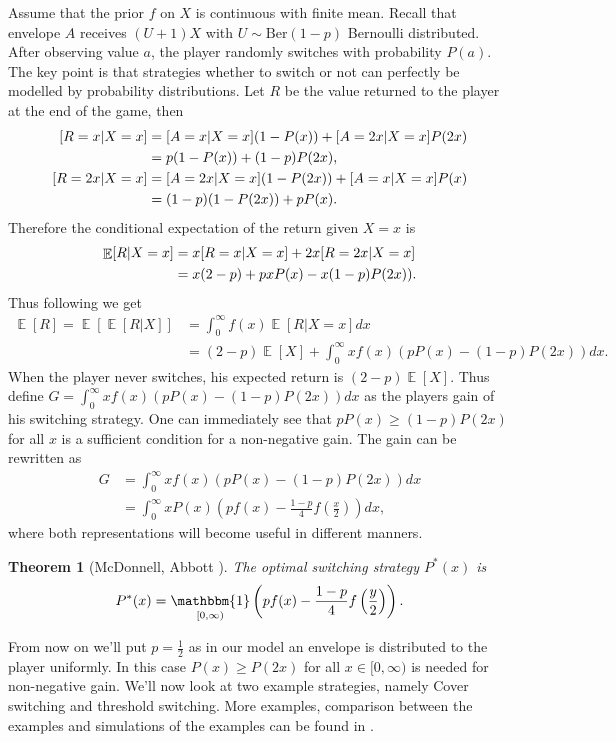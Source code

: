 \documentclass[twoside,a4paper]{article}
\theoremstyle{plain}
\newtheorem{theorem}{Theorem}[section]
\theoremstyle{definition}
\theoremstyle{remark}
\numberwithin{equation}{section}
\let\P\relax
\DeclareMathOperator{\P}{\mathbb{P}}
\DeclareMathOperator{\E}{\mathbb{E}}
\DeclareMathOperator{\1}{\mathbbm{1}}
\begin{document}
Assume that the prior $f$ on $X$ is continuous with finite mean. Recall that envelope $A$ receives $(U+1)X$ with $U\sim\mathrm{Ber}(1-p)$ Bernoulli distributed. After observing value $a$, the player randomly switches with probability $P(a)$. The key point is that strategies whether to switch or not can perfectly be modelled by probability distributions. Let $R$ be the value returned to the player at the end of the game, then
\begin{align*}
\P[R=x|X=x]&=\P[A=x|X=x](1-P(x))+\P[A=2x|X=x]P(2x)\\
&=p(1-P(x))+(1-p)P(2x),\\
\P[R=2x|X=x]&=\P[A=2x|X=x](1-P(2x))+\P[A=x|X=x]P(x)\\
&=(1-p)(1-P(2x))+pP(x).
\end{align*}
Therefore the conditional expectation of the return given $X=x$ is 
\begin{align*}
\E[R|X=x]&=x\P[R=x|X=x]+2x\P[R=2x|X=x]\\
&=x(2-p)+pxP(x)-x(1-p)P(2x)).
\end{align*}
Thus following \cite{McDonnell09} we get
\begin{align*}
\E[R]=\E[\E[R|X]]&=\int_0^\infty f(x)\E[R|X=x]dx\\
&=(2-p)\E[X]+\int_0^\infty xf(x)(pP(x)-(1-p)P(2x))dx.
\end{align*}
When the player never switches, his expected return is $(2-p)\E[X]$. Thus define $G=\int_0^\infty xf(x)(pP(x)-(1-p)P(2x))dx$ as the players gain of his switching strategy. One can immediately see that $pP(x)\geq(1-p)P(2x)$ for all $x$ is a sufficient condition for a non-negative gain. The gain can be rewritten as
\begin{align}
G&=\int_0^\infty xf(x)(pP(x)-(1-p)P(2x))dx\\
&=\int_0^\infty xP(x)\left(pf(x)-\frac{1-p}{4}f\left(\frac{x}{2}\right)\right)dx,\label{eq:gainprop}
\end{align}
where both representations will become useful in different manners.
\begin{theorem}[McDonnell, Abbott \cite{McDonnell09}]\label{thm:switchopt}
The optimal switching strategy $P^*(x)$ is 
\[P^*(x)=\1_{[0,\infty)}\left(pf(x)-\frac{1-p}{4}f\left(\frac{y}{2}\right)\right).\]
\end{theorem}


From now on we'll put $p=\frac{1}{2}$ as in our model an envelope is  distributed to the player uniformly. In this case $P(x)\geq P(2x)$ for all $x\in[0,\infty)$ is needed for non-negative gain. We'll now look at two example strategies, namely Cover switching and threshold switching. More examples, comparison between the examples and simulations of the examples can be found in \cite{McDonnell09,McDonnell11}.
\end{document}
